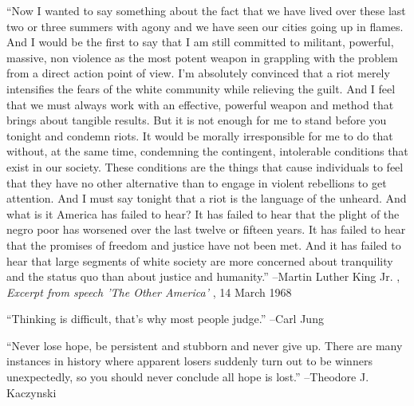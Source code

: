 \documentclass{article}%
\begin{document}
\begin{minipage}{\textwidth}%
\flushleft%
“Now I wanted to say something about the fact that we have lived over these last two or three summers with agony and we have seen our cities going up in flames. And I would be the first to say that I am still committed to militant, powerful, massive, non violence as the most potent weapon in grappling with the problem from a direct action point of view. I'm absolutely convinced that a riot merely intensifies the fears of the white community while relieving the guilt. And I feel that we must always work with an effective, powerful weapon and method that brings about tangible results. But it is not enough for me to stand before you tonight and condemn riots. It would be morally irresponsible for me to do that without, at the same time, condemning the contingent, intolerable conditions that exist in our society. These conditions are the things that cause individuals to feel that they have no other alternative than to engage in violent rebellions to get attention. And I must say tonight that a riot is the language of the unheard. And what is it America has failed to hear? It has failed to hear that the plight of the negro poor has worsened over the last twelve or fifteen years. It has failed to hear that the promises of freedom and justice have not been met. And it has failed to hear that large segments of white society are more concerned about tranquility and the status quo than about justice and humanity.”%
\linebreak%
\vspace{1mm}%
–Martin Luther King Jr.%
, \textit{Excerpt from speech 'The Other America'}%
, 14 March 1968%
\linebreak%
\vspace{1mm}%
\end{minipage}%
\linebreak%
\vspace{1mm}%
\begin{minipage}{\textwidth}%
\flushleft%
“Thinking is difficult, that's why most people judge.”%
\linebreak%
\vspace{1mm}%
–Carl Jung%
\linebreak%
\vspace{1mm}%
\end{minipage}%
\linebreak%
\vspace{1mm}%
\begin{minipage}{\textwidth}%
\flushleft%
“Never lose hope, be persistent and stubborn and never give up. There are many instances in history where apparent losers suddenly turn out to be winners unexpectedly, so you should never conclude all hope is lost.”%
\linebreak%
\vspace{1mm}%
–Theodore J. Kaczynski%
\linebreak%
\vspace{1mm}%
\end{minipage}%
\end{document}
